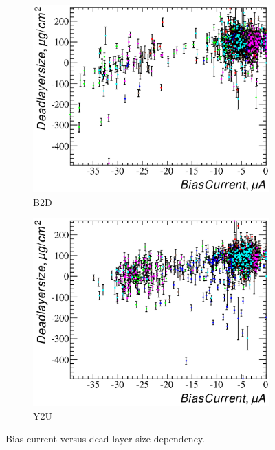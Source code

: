 \documentclass[a4paper,12pt]{article}
\begin{document}
\newcommand\bcvsxdllabel{Bias current versus dead layer size dependency.}
\begin{figure}
\begin{subfigure}[t]{0.5\textwidth}
\includegraphics[width=\textwidth]{gfx/run13_alpha_study_novoltagevariation/B2D/c_hBiasCurrent_DeadLayerSize.eps}
\caption{B2D}
\end{subfigure}
%
\begin{subfigure}[t]{0.5\textwidth}
\includegraphics[width=\textwidth]{gfx/run13_alpha_study_novoltagevariation/Y2U/c_hBiasCurrent_DeadLayerSize.eps}
\caption{Y2U}
\end{subfigure}
\caption{\bcvsxdllabel{}}
\label{fig:bc_vs_xdl}
\end{figure}
\end{document}
